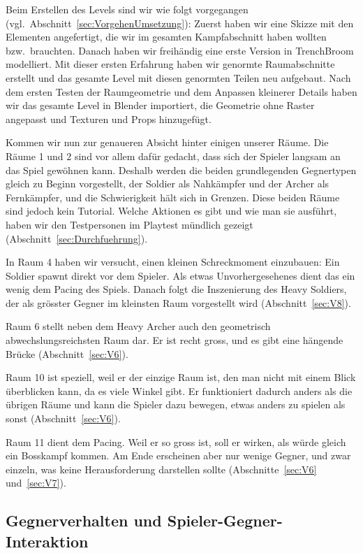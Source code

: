 \documentclass[../Main.tex]{subfiles}
\begin{document}
Beim Erstellen des Levels sind wir wie folgt vorgegangen (vgl.\ Abschnitt~\ref{sec:VorgehenUmsetzung}): Zuerst haben wir eine Skizze mit den Elementen angefertigt, die wir im gesamten Kampfabschnitt haben wollten bzw.\ brauchten. Danach haben wir freihändig eine erste Version in TrenchBroom modelliert. Mit dieser ersten Erfahrung haben wir genormte Raumabschnitte erstellt und das gesamte Level mit diesen genormten Teilen neu aufgebaut. Nach dem ersten Testen der Raumgeometrie und dem Anpassen kleinerer Details haben wir das gesamte Level in Blender importiert, die Geometrie ohne Raster angepasst und Texturen und Props hinzugefügt.

Kommen wir nun zur genaueren Absicht hinter einigen unserer Räume. Die Räume 1 und 2 sind vor allem dafür gedacht, dass sich der Spieler langsam an das Spiel gewöhnen kann. Deshalb werden die beiden grundlegenden Gegnertypen gleich zu Beginn vorgestellt, der Soldier als Nahkämpfer und der Archer als Fernkämpfer, und die Schwierigkeit hält sich in Grenzen. Diese beiden Räume sind jedoch kein Tutorial. Welche Aktionen es gibt und wie man sie ausführt, haben wir den Testpersonen im Playtest mündlich gezeigt (Abschnitt~\ref{sec:Durchfuehrung}).

In Raum 4 haben wir versucht, einen kleinen Schreckmoment einzubauen: Ein Soldier spawnt direkt vor dem Spieler. Als etwas Unvorhergesehenes dient das ein wenig dem Pacing des Spiels. Danach folgt die Inszenierung des Heavy Soldiers, der als grösster Gegner im kleinsten Raum vorgestellt wird (Abschnitt~\ref{sec:V8}).

Raum 6 stellt neben dem Heavy Archer auch den geometrisch abwechslungsreichsten Raum dar. Er ist recht gross, und es gibt eine hängende Brücke (Abschnitt~\ref{sec:V6}).

Raum 10 ist speziell, weil er der einzige Raum ist, den man nicht mit einem Blick überblicken kann, da es viele Winkel gibt. Er funktioniert dadurch anders als die übrigen Räume und kann die Spieler dazu bewegen, etwas anders zu spielen als sonst (Abschnitt~\ref{sec:V6}).

Raum 11 dient dem Pacing. Weil er so gross ist, soll er wirken, als würde gleich ein Bosskampf kommen. Am Ende erscheinen aber nur wenige Gegner, und zwar einzeln, was keine Herausforderung darstellen sollte (Abschnitte~\ref{sec:V6} und~\ref{sec:V7}).

\subsection{Gegnerverhalten und Spieler-Gegner-Interaktion} \label{sec:UmsetzungGegner}
\end{document}
